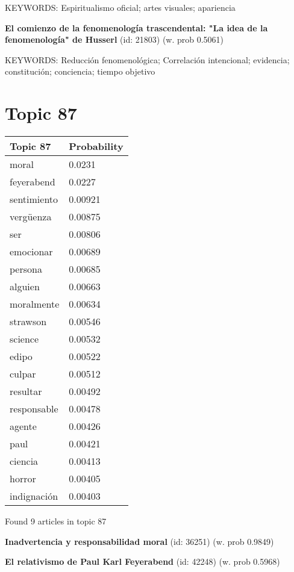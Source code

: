 \documentclass{article}
\begin{document}
KEYWORDS:
Espiritualismo oficial; artes visuales; apariencia
\vfill

\textbf{El comienzo de la fenomenología trascendental: "La idea de la fenomenología" de Husserl} (id: 21803)
 (w. prob 0.5061)


KEYWORDS:
Reducción fenomenológica; Correlación intencional; evidencia; constitución; conciencia; tiempo objetivo

\vfill
\newpage


\centering
\thispagestyle{empty}
\section*{Topic 87}\vfill
\begin{tabular}{ll}
\toprule
    Topic 87 & Probability \\
\midrule
       moral &      0.0231 \\
  feyerabend &      0.0227 \\
 sentimiento &     0.00921 \\
   vergüenza &     0.00875 \\
         ser &     0.00806 \\
   emocionar &     0.00689 \\
     persona &     0.00685 \\
     alguien &     0.00663 \\
  moralmente &     0.00634 \\
    strawson &     0.00546 \\
     science &     0.00532 \\
       edipo &     0.00522 \\
      culpar &     0.00512 \\
    resultar &     0.00492 \\
 responsable &     0.00478 \\
      agente &     0.00426 \\
        paul &     0.00421 \\
     ciencia &     0.00413 \\
      horror &     0.00405 \\
 indignación &     0.00403 \\
\bottomrule
\end{tabular}

\vfill
Found 9 articles in topic 87
\vfill

\textbf{Inadvertencia y responsabilidad moral} (id: 36251)
 (w. prob 0.9849)
\vfill

\textbf{El relativismo  de Paul Karl Feyerabend} (id: 42248)
 (w. prob 0.5968)
\vfill
\end{document}
